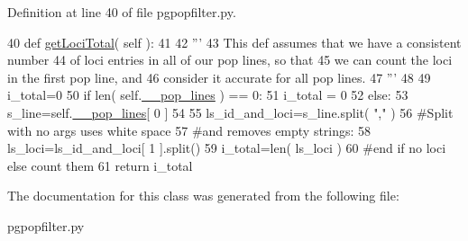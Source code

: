 Definition at line 40 of file pgpopfilter.\+py.


\begin{DoxyCode}
40     \textcolor{keyword}{def }\hyperlink{classnegui_1_1pgpopfilter_1_1PGPopFilter_a113b227b9a532f19722810b1a394040c}{getLociTotal}( self ):
41 
42         \textcolor{stringliteral}{'''}
43 \textcolor{stringliteral}{        This def assumes that we have a consistent number}
44 \textcolor{stringliteral}{        of loci entries in all of our pop lines, so that}
45 \textcolor{stringliteral}{        we can count the loci in the first pop line, and}
46 \textcolor{stringliteral}{        consider it accurate for all pop lines.}
47 \textcolor{stringliteral}{        '''}
48 
49         i\_total=0
50         \textcolor{keywordflow}{if} len( self.\hyperlink{classnegui_1_1pgpopfilter_1_1PGPopFilter_a97195808c691697d5b6eae50643b7ac6}{\_\_pop\_lines} ) == 0:
51             i\_total = 0
52         \textcolor{keywordflow}{else}:
53             s\_line=self.\hyperlink{classnegui_1_1pgpopfilter_1_1PGPopFilter_a97195808c691697d5b6eae50643b7ac6}{\_\_pop\_lines}[ 0 ]
54 
55             ls\_id\_and\_loci=s\_line.split( \textcolor{stringliteral}{","} )
56             \textcolor{comment}{#Split with no args uses white space}
57             \textcolor{comment}{#and removes empty strings:}
58             ls\_loci=ls\_id\_and\_loci[ 1 ].split()
59             i\_total=len( ls\_loci )
60         \textcolor{comment}{#end if no loci else count them}
61         \textcolor{keywordflow}{return} i\_total
\end{DoxyCode}


The documentation for this class was generated from the following file\+:\begin{DoxyCompactItemize}
\item 
pgpopfilter.\+py\end{DoxyCompactItemize}
